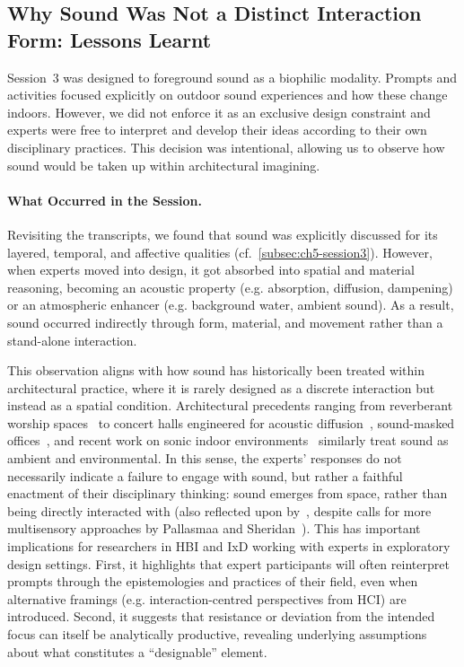 \subsection{Why Sound Was Not a Distinct Interaction Form: Lessons Learnt}
Session~3 was designed to foreground sound as a biophilic modality. Prompts and activities focused explicitly on outdoor sound experiences and how these change indoors. However, we did not enforce it as an exclusive design constraint and experts were free to interpret and develop their ideas according to their own disciplinary practices. This decision was intentional, allowing us to observe how sound would be taken up within architectural imagining.

\paragraph{What Occurred in the Session.}
Revisiting the transcripts, we found that sound was explicitly discussed for its layered, temporal, and affective qualities (cf.~\autoref{subsec:ch5-session3}). However, when experts moved into design, it got absorbed into spatial and material reasoning, becoming an acoustic property (e.g. absorption, diffusion, dampening) or an atmospheric enhancer (e.g. background water, ambient sound). As a result, sound occurred indirectly through form, material, and movement rather than a stand-alone interaction.

This observation aligns with how sound has historically been treated within architectural practice, where it is rarely designed as a discrete interaction but instead as a spatial condition. Architectural precedents ranging from reverberant worship spaces~\cite{mcmahon2013space} to concert halls engineered for acoustic diffusion~\cite{wheatley2007sound}, sound-masked offices~\cite{bruyninckx2023tuning, jacobsen2023living}, and recent work on sonic indoor environments~\cite{petersen2025sound, nabil2017interioractive} similarly treat sound as ambient and environmental. In this sense, the experts’ responses do not necessarily indicate a failure to engage with sound, but rather a faithful enactment of their disciplinary thinking: sound emerges from space, rather than being directly interacted with (also reflected upon by~\citet{fowler2015sounds}, despite calls for more multisensory approaches by Pallasmaa and Sheridan~\cite{pallasmaa2024eyes}). This has important implications for researchers in HBI and IxD working with experts in exploratory design settings. First, it highlights that expert participants will often reinterpret prompts through the epistemologies and practices of their field, even when alternative framings (e.g. interaction-centred perspectives from HCI) are introduced. Second, it suggests that resistance or deviation from the intended focus can itself be analytically productive, revealing underlying assumptions about what constitutes a ``designable'' element.



